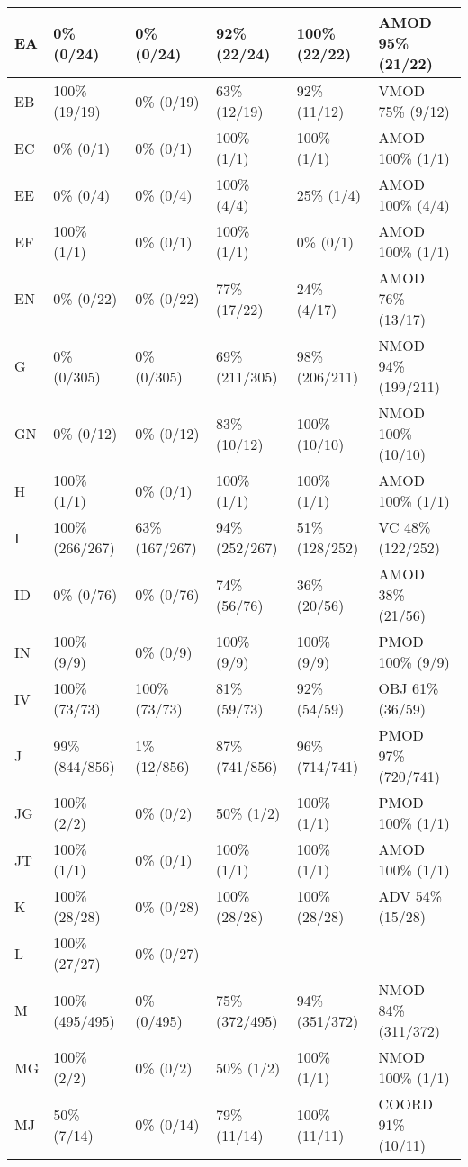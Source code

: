 \begin{small}
\begin{longtable}{|l|l|l|l|l|l|}
\hline
EA & 0\% (0/24) & 0\% (0/24) & 92\% (22/24) & 100\% (22/22) & AMOD 95\% (21/22) \\ 
\hline
EB & 100\% (19/19) & 0\% (0/19) & 63\% (12/19) & 92\% (11/12) & VMOD 75\% (9/12) \\ 
\hline
EC & 0\% (0/1) & 0\% (0/1) & 100\% (1/1) & 100\% (1/1) & AMOD 100\% (1/1) \\ 
\hline
EE & 0\% (0/4) & 0\% (0/4) & 100\% (4/4) & 25\% (1/4) & AMOD 100\% (4/4) \\ 
\hline
EF & 100\% (1/1) & 0\% (0/1) & 100\% (1/1) & 0\% (0/1) & AMOD 100\% (1/1) \\ 
\hline
EN & 0\% (0/22) & 0\% (0/22) & 77\% (17/22) & 24\% (4/17) & AMOD 76\% (13/17) \\ 
\hline
G & 0\% (0/305) & 0\% (0/305) & 69\% (211/305) & 98\% (206/211) & NMOD 94\% (199/211) \\ 
\hline
GN & 0\% (0/12) & 0\% (0/12) & 83\% (10/12) & 100\% (10/10) & NMOD 100\% (10/10) \\ 
\hline
H & 100\% (1/1) & 0\% (0/1) & 100\% (1/1) & 100\% (1/1) & AMOD 100\% (1/1) \\ 
\hline
I & 100\% (266/267) & 63\% (167/267) & 94\% (252/267) & 51\% (128/252) & VC 48\% (122/252) \\ 
\hline
ID & 0\% (0/76) & 0\% (0/76) & 74\% (56/76) & 36\% (20/56) & AMOD 38\% (21/56) \\ 
\hline
IN & 100\% (9/9) & 0\% (0/9) & 100\% (9/9) & 100\% (9/9) & PMOD 100\% (9/9) \\ 
\hline
IV & 100\% (73/73) & 100\% (73/73) & 81\% (59/73) & 92\% (54/59) & OBJ 61\% (36/59) \\ 
\hline
J & 99\% (844/856) & 1\% (12/856) & 87\% (741/856) & 96\% (714/741) & PMOD 97\% (720/741) \\ 
\hline
JG & 100\% (2/2) & 0\% (0/2) & 50\% (1/2) & 100\% (1/1) & PMOD 100\% (1/1) \\ 
\hline
JT & 100\% (1/1) & 0\% (0/1) & 100\% (1/1) & 100\% (1/1) & AMOD 100\% (1/1) \\ 
\hline
K & 100\% (28/28) & 0\% (0/28) & 100\% (28/28) & 100\% (28/28) & ADV 54\% (15/28) \\ 
\hline
L & 100\% (27/27) & 0\% (0/27) & - & - & - \\ 
\hline
M & 100\% (495/495) & 0\% (0/495) & 75\% (372/495) & 94\% (351/372) & NMOD 84\% (311/372) \\ 
\hline
MG & 100\% (2/2) & 0\% (0/2) & 50\% (1/2) & 100\% (1/1) & NMOD 100\% (1/1) \\ 
\hline
MJ & 50\% (7/14) & 0\% (0/14) & 79\% (11/14) & 100\% (11/11) & COORD 91\% (10/11) \\ 

\end{longtable}
\end{small}
